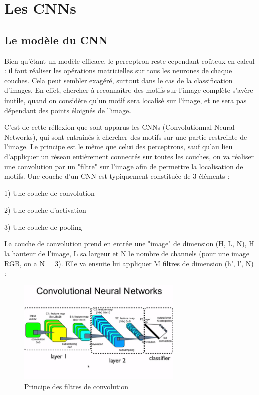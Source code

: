 \section{Les CNNs}

\fancyhead[R]{\textit{\nouppercase{\leftmark}}}

\subsection{Le modèle du CNN}

Bien qu'étant un modèle efficace, le perceptron reste cependant coûteux en calcul : il faut réaliser les opérations matricielles sur tous les neurones de chaque couches.
Cela peut sembler exagéré, surtout dans le cas de la classification d'images. 
En effet, chercher à reconnaître des motifs sur l'image complète s'avère inutile, quand on considère qu'un motif sera localisé sur l'image, et ne sera pas dépendant des points éloignés de l'image.

C'est de cette réflexion que sont apparus les CNNs (Convolutionnal Neural Networks), qui sont entrainés à chercher des motifs sur une partie restreinte de l'image.
Le principe est le même que celui des perceptrons, sauf qu'au lieu d'appliquer un réseau entièrement connectés sur toutes les couches, on va réaliser une convolution par un "filtre" sur l'image afin de permettre la localisation de motifs.
Une couche d'un CNN est typiquement constituée de 3 éléments : 

1) Une couche de convolution

2) Une couche d'activation 

3) Une couche de pooling


La couche de convolution prend en entrée une "image" de dimension (H, L, N), H la hauteur de l'image, L sa largeur et N le nombre de channels (pour une image RGB, on a N = 3). 
Elle va ensuite lui appliquer M filtres de dimension (h', l', N) :

\begin{figure}[h]
 \centering
 \includegraphics[width=0.7\textwidth]{img/CNN_filtre.png}
 \caption{Principe des filtres de convolution}
\end{figure}

